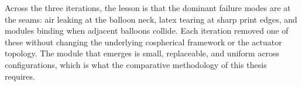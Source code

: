 Across the three iterations, the lesson is that the dominant failure modes are at the seams: air leaking at the balloon neck, latex tearing at sharp print edges, and modules binding when adjacent balloons collide. Each iteration removed one of these without changing the underlying cospherical framework or the actuator topology. The module that emerges is small, replaceable, and uniform across configurations, which is what the comparative methodology of this thesis requires.
